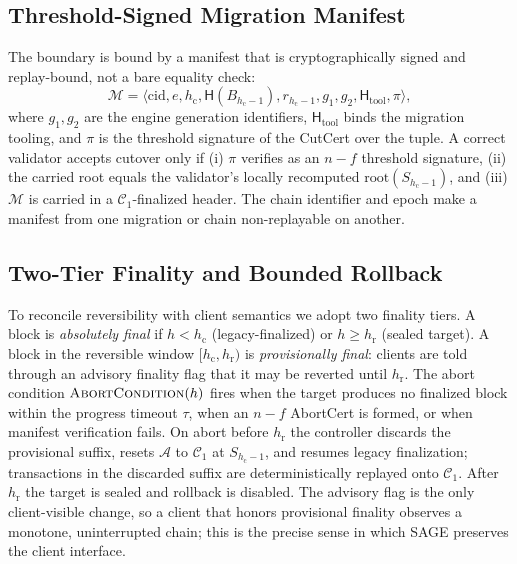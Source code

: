 \documentclass[journal]{IEEEtran}
\begin{document}
\subsection{Threshold-Signed Migration Manifest}
The boundary is bound by a manifest that is cryptographically signed and replay-bound, not a
bare equality check:
\begin{equation}
\mathcal{M} = \big\langle \mathrm{cid}, e, h_{\mathrm{c}}, \mathsf{H}(B_{h_{\mathrm{c}}-1}),
r_{h_{\mathrm{c}}-1}, g_1, g_2, \mathsf{H}_{\mathrm{tool}}, \pi \big\rangle,
\end{equation}
where $g_1,g_2$ are the engine generation identifiers, $\mathsf{H}_{\mathrm{tool}}$ binds the
migration tooling, and $\pi$ is the threshold signature of the CutCert over the tuple. A
correct validator accepts cutover only if (i) $\pi$ verifies as an $n-f$ threshold signature,
(ii) the carried root equals the validator's locally recomputed
$\mathrm{root}(S_{h_{\mathrm{c}}-1})$, and (iii) $\mathcal{M}$ is carried in a
$\mathcal{C}_1$-finalized header. The chain identifier and epoch make a manifest from one
migration or chain non-replayable on another.

\subsection{Two-Tier Finality and Bounded Rollback}
To reconcile reversibility with client semantics we adopt two finality tiers. A block is
\emph{absolutely final} if $h < h_{\mathrm{c}}$ (legacy-finalized) or $h \ge h_{\mathrm{r}}$
(sealed target). A block in the reversible window $[h_{\mathrm{c}}, h_{\mathrm{r}})$ is
\emph{provisionally final}: clients are told through an advisory finality flag that it may be
reverted until $h_{\mathrm{r}}$. The abort condition $\textsc{AbortCondition}(h)$ fires when
the target produces no finalized block within the progress timeout $\tau$, when an $n-f$
AbortCert is formed, or when manifest verification fails. On abort before $h_{\mathrm{r}}$ the
controller discards the provisional suffix, resets $\mathcal{A}$ to $\mathcal{C}_1$ at
$S_{h_{\mathrm{c}}-1}$, and resumes legacy finalization; transactions in the discarded suffix
are deterministically replayed onto $\mathcal{C}_1$. After $h_{\mathrm{r}}$ the target is
sealed and rollback is disabled. The advisory flag is the only client-visible change, so a
client that honors provisional finality observes a monotone, uninterrupted chain; this is the
precise sense in which SAGE preserves the client interface.
\end{document}
